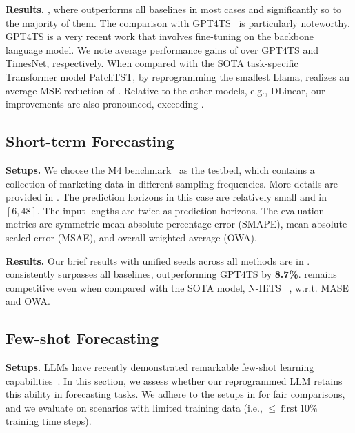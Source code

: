 \noindent\textbf{Results.} 
, where \method outperforms all baselines in most cases and significantly so to the majority of them. The comparison with GPT4TS~\citep{zhou2023one} is particularly noteworthy. GPT4TS is a very recent work that involves fine-tuning on the backbone language model. We note average performance gains of  over GPT4TS and TimesNet, respectively. When compared with the SOTA task-specific Transformer model PatchTST, by reprogramming the smallest Llama, \method realizes an average MSE reduction of . Relative to the other models, e.g., DLinear, our improvements are also pronounced, exceeding .



\subsection{Short-term Forecasting}
\vspace{-2mm}


\noindent\textbf{Setups.} We choose the M4 benchmark~\citep{makridakis2018m4} as the testbed, which contains a collection of marketing data in different sampling frequencies. More details are provided in . The prediction horizons in this case are relatively small and in $[6,48]$. The input lengths are twice as prediction horizons. The evaluation metrics are symmetric mean absolute percentage error (SMAPE), mean absolute scaled error (MSAE), and overall weighted average (OWA). 

\noindent\textbf{Results.} Our brief results with unified seeds across all methods are in . \method consistently surpasses all baselines, outperforming GPT4TS by \textbf{8.7\%}. \method remains competitive even when compared with the SOTA model, N-HiTS~\citep{challu2023nhits} , w.r.t. MASE and OWA.

\subsection{Few-shot Forecasting}
\vspace{-2mm}
\noindent\textbf{Setups.} LLMs have recently demonstrated remarkable few-shot learning capabilities~\citep{liu2023large}. In this section, we assess whether our reprogrammed LLM retains this ability in forecasting tasks. We adhere to the setups in \citep{zhou2023one} for fair comparisons, and we evaluate on scenarios with limited training data (i.e., $\leq\ \text{first}\ 10\%$ training time steps).

